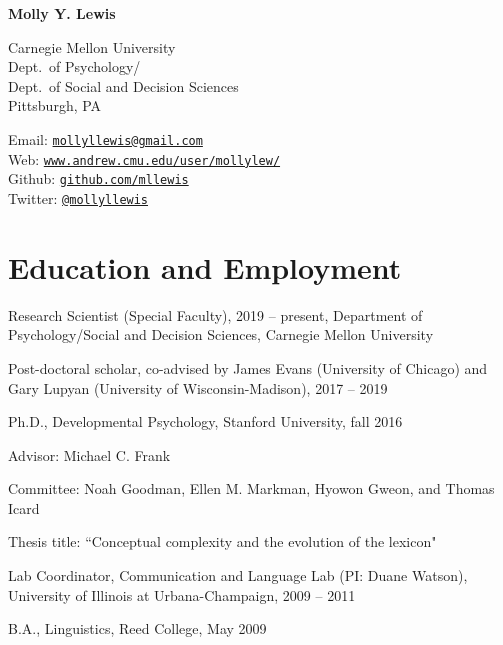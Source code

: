 \documentclass[letterpaper]{article}
\def\name{Molly Y.  Lewis}
\renewenvironment{itemize}{
  \begin{list}{}{
    \setlength{\leftmargin}{1.5em}
  }
}{
  \end{list}
}
\begin{document}
\centerline{\huge \bf \name}
\vspace{0.25in}


 \normalsize
  \begin{multicols}{2}
\begin{flushleft}
  Carnegie Mellon University  \\
  Dept.\ of Psychology/ \\
  Dept.\ of Social and Decision Sciences\\
  Pittsburgh, PA
\end{flushleft}
\begin{flushleft}
Email: \href{mailto:mollyllewis@gmail.com}{\tt mollyllewis@gmail.com}\\
Web: \href{http://www.andrew.cmu.edu/user/mollylew/}{\tt www.andrew.cmu.edu/user/mollylew/}\\
Github: \href{https://github.com/mllewis}{\tt github.com/mllewis}\\
Twitter: \href{https://twitter.com/mollyllewis}{\tt @mollyllewis}\\

\end{flushleft}

\end{multicols}

\section*{Education and Employment}
\begin{itemize}

\item Research Scientist (Special Faculty), 2019 -- present, Department of Psychology/Social and Decision Sciences, Carnegie Mellon University

\item Post-doctoral scholar, co-advised by James Evans (University of Chicago) and Gary Lupyan (University of Wisconsin-Madison), 2017 -- 2019


  \item Ph.D., Developmental Psychology, Stanford University, fall 2016
  \begin{itemize}
  	\item Advisor: Michael C. Frank
  		\item Committee: Noah Goodman, Ellen M. Markman, Hyowon Gweon, and Thomas Icard
  	\item Thesis title: ``Conceptual complexity and the evolution of the lexicon"

   \end{itemize}
   \item Lab Coordinator, Communication and Language Lab (PI: Duane Watson), University of Illinois at Urbana-Champaign,  2009 -- 2011
  \item  B.A., Linguistics, Reed College, May 2009
  \end{itemize}
\end{document}
